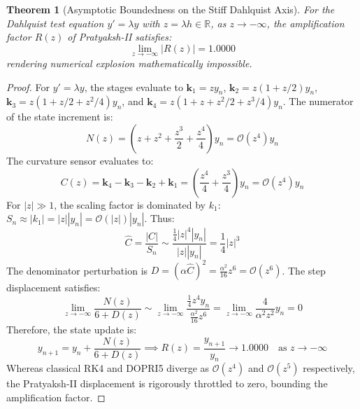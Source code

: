 \documentclass[11pt,a4paper]{article}
\theoremstyle{plain}
\newtheorem{theorem}{Theorem}
\theoremstyle{definition}
\begin{document}
\begin{theorem}[Asymptotic Boundedness on the Stiff Dahlquist Axis]
For the Dahlquist test equation $y' = \lambda y$ with $z = \lambda h \in \mathbb{R}$, as $z \to -\infty$, the amplification factor $R(z)$ of Pratyaksh-II satisfies:
\begin{equation}
\lim_{z \to -\infty} |R(z)| = 1.0000
\end{equation}
rendering numerical explosion mathematically impossible.
\end{theorem}
\begin{proof}
For $y' = \lambda y$, the stages evaluate to $\mathbf{k}_1 = z y_n$, $\mathbf{k}_2 = z(1 + z/2) y_n$, $\mathbf{k}_3 = z(1 + z/2 + z^2/4) y_n$, and $\mathbf{k}_4 = z(1 + z + z^2/2 + z^3/4) y_n$.
The numerator of the state increment is:
\begin{equation}
N(z) = \left( z + z^2 + \frac{z^3}{2} + \frac{z^4}{4} \right) y_n = \mathcal{O}(z^4) y_n
\end{equation}
The curvature sensor evaluates to:
\begin{equation}
C(z) = \mathbf{k}_4 - \mathbf{k}_3 - \mathbf{k}_2 + \mathbf{k}_1 = \left( \frac{z^4}{4} + \frac{z^3}{4} \right) y_n = \mathcal{O}(z^4) y_n
\end{equation}
For $|z| \gg 1$, the scaling factor is dominated by $k_1$: $S_n \approx |k_1| = |z| |y_n| = \mathcal{O}(|z|) |y_n|$. Thus:
\begin{equation}
\hat{C} = \frac{|C|}{S_n} \sim \frac{\frac{1}{4} |z|^4 |y_n|}{|z| |y_n|} = \frac{1}{4} |z|^3
\end{equation}
The denominator perturbation is $D = (\alpha \hat{C})^2 = \frac{\alpha^2}{16} z^6 = \mathcal{O}(z^6)$.
The step displacement satisfies:
\begin{equation}
\lim_{z \to -\infty} \frac{N(z)}{6 + D(z)} \sim \lim_{z \to -\infty} \frac{\frac{1}{4} z^4 y_n}{\frac{\alpha^2}{16} z^6} = \lim_{z \to -\infty} \frac{4}{\alpha^2 z^2} y_n = 0
\end{equation}
Therefore, the state update is:
\begin{equation}
y_{n+1} = y_n + \frac{N(z)}{6 + D(z)} \implies R(z) = \frac{y_{n+1}}{y_n} \to 1.0000 \quad \text{as } z \to -\infty
\end{equation}
Whereas classical RK4 and DOPRI5 diverge as $\mathcal{O}(z^4)$ and $\mathcal{O}(z^5)$ respectively, the Pratyaksh-II displacement is rigorously throttled to zero, bounding the amplification factor.
\end{proof}
\end{document}
